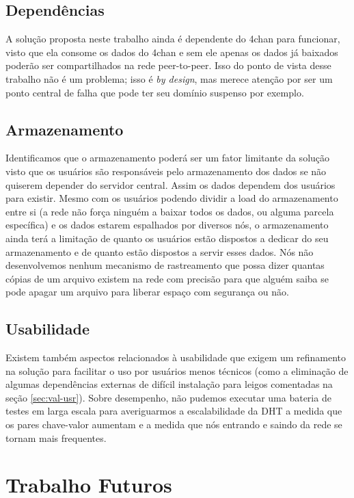 \subsection{Dependências}

A solução proposta neste trabalho ainda é dependente do 4chan para funcionar, visto que ela consome os dados do 4chan e sem ele apenas os dados já baixados poderão ser compartilhados na rede peer-to-peer.
Isso do ponto de vista desse trabalho não é um problema; isso é \textit{by design}, mas merece atenção por ser um ponto central de falha que pode ter seu domínio suspenso por exemplo.

\subsection{Armazenamento}

Identificamos que o armazenamento poderá ser um fator limitante da solução visto que os usuários são responsáveis pelo armazenamento dos dados se não quiserem depender do servidor central.
Assim os dados dependem dos usuários para existir.
Mesmo com os usuários podendo dividir a load do armazenamento entre si (a rede não força ninguém a baixar todos os dados, ou alguma parcela específica) e os dados estarem espalhados por diversos nós, o armazenamento ainda terá a limitação de quanto os usuários estão dispostos a dedicar do seu armazenamento e de quanto estão dispostos a servir esses dados.
Nós não desenvolvemos nenhum mecanismo de rastreamento que possa dizer quantas cópias de um arquivo existem na rede com precisão para que alguém saiba se pode apagar um arquivo para liberar espaço com segurança ou não.

\subsection{Usabilidade}

Existem também aspectos relacionados à usabilidade que exigem um refinamento na solução para facilitar o uso por usuários menos técnicos (como a eliminação de algumas dependências externas de difícil instalação para leigos comentadas na seção \ref{sec:val-usr}).
Sobre desempenho, não pudemos executar uma bateria de testes em larga escala para averiguarmos a escalabilidade da DHT a medida que os pares chave-valor aumentam e a medida que nós entrando e saindo da rede se tornam mais frequentes.

\section{Trabalho Futuros}

